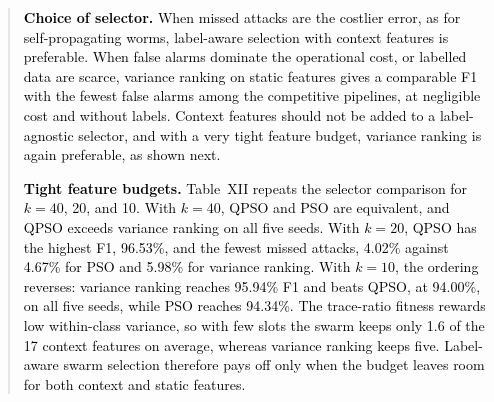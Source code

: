 \documentclass[11pt]{article}
\newenvironment{excerpt}{\begin{quote}\sloppy}{\end{quote}}
\begin{document}
\begin{excerpt}
\textcolor{black}{\textbf{Choice of selector.} When
missed attacks are the costlier error, as for self-propagating worms,
label-aware selection with context features is preferable. When false
alarms dominate the operational cost, or labelled data are scarce,
variance ranking on static features gives a comparable F1 with the
fewest false alarms among the competitive pipelines, at negligible
cost and without labels. Context features should not be added to a
label-agnostic selector, and with a very tight feature budget,
variance ranking is again preferable, as shown next.}

\textcolor{black}{\textbf{Tight feature budgets.}
Table~XII repeats the selector comparison for $k=40$, 20,
and 10. With $k=40$, QPSO and PSO are equivalent, and QPSO exceeds
variance ranking on all five seeds. With $k=20$, QPSO has the highest
F1, 96.53\%, and the fewest missed attacks, 4.02\% against 4.67\% for
PSO and 5.98\% for variance ranking. With $k=10$, the ordering
reverses: variance ranking reaches 95.94\% F1 and beats QPSO, at
94.00\%, on all five seeds, while PSO reaches 94.34\%. The trace-ratio
fitness rewards low within-class variance, so with few slots the
swarm keeps only 1.6 of the 17 context features on average, whereas
variance ranking keeps five. Label-aware swarm selection therefore
pays off only when the budget leaves room for both context and static
features.}

\setcounter{table}{11}
\begin{table}[H]
\centering
\scriptsize
\caption{\textcolor{red}{Selector comparison under feature budgets of 40, 20, and 10 over five seeds; the consensus mask uses ten. Ctx.: context features kept. Wins: seeds on which QPSO has the higher F1.}}


\end{table}
\end{excerpt}
\end{document}
